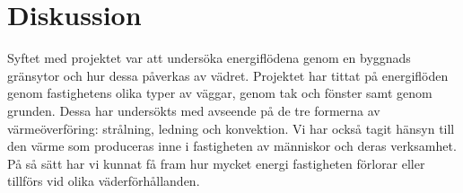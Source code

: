 \chapter{Diskussion}

Syftet med projektet var att undersöka energiflödena genom en byggnads gränsytor och hur dessa påverkas av vädret. Projektet har tittat på energiflöden genom fastighetens olika typer av väggar, genom tak och fönster samt genom grunden. Dessa har undersökts med avseende på de tre formerna av värmeöverföring: strålning, ledning och konvektion. Vi har också tagit hänsyn till den värme som produceras inne i fastigheten av människor och deras verksamhet. På så sätt har vi kunnat få fram hur mycket energi fastigheten förlorar eller tillförs vid olika väderförhållanden.










